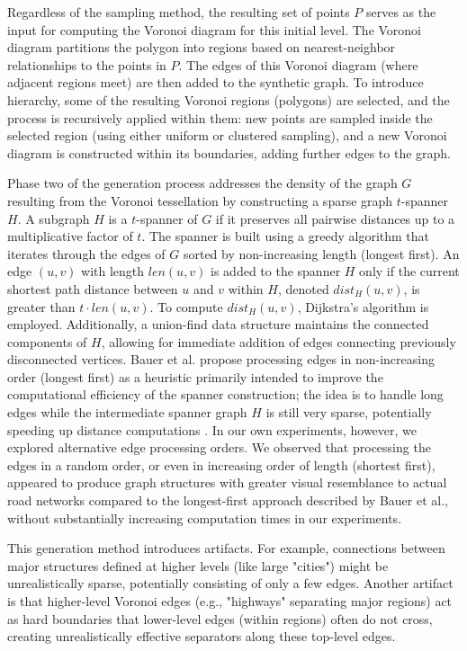 Regardless of the sampling method, the resulting set of points \(P\) serves as the input for computing the Voronoi diagram for this initial level.
The Voronoi diagram partitions the polygon into regions based on nearest-neighbor relationships to the points in \(P\).
The edges of this Voronoi diagram (where adjacent regions meet) are then added to the synthetic graph.
To introduce hierarchy, some of the resulting Voronoi regions (polygons) are selected, and the process is recursively applied within them: new points are sampled inside the selected region (using either uniform or clustered sampling), and a new Voronoi diagram is constructed within its boundaries, adding further edges to the graph.

Phase two of the generation process addresses the density of the graph \(G\) resulting from the Voronoi tessellation by constructing a sparse graph \(t\)-spanner \(H\).
A subgraph \(H\) is a \(t\)-spanner of \(G\) if it preserves all pairwise distances up to a multiplicative factor of \(t\).
The spanner is built using a greedy algorithm that iterates through the edges of \(G\) sorted by non-increasing length (longest first).
An edge \((u, v)\) with length \(len(u, v)\) is added to the spanner \(H\) only if the current shortest path distance between \(u\) and \(v\) within \(H\), denoted \(dist_H(u, v)\), is greater than \(t \cdot len(u, v)\).
To compute \(dist_H(u, v)\), Dijkstra's algorithm is employed.
Additionally, a union-find data structure maintains the connected components of \(H\), allowing for immediate addition of edges connecting previously disconnected vertices.
Bauer et al. propose processing edges in non-increasing order (longest first) as a heuristic primarily intended to improve the computational efficiency of the spanner construction; the idea is to handle long edges while the intermediate spanner graph \(H\) is still very sparse, potentially speeding up distance computations \cite{hutchison_synthetic_2010}.
In our own experiments, however, we explored alternative edge processing orders.
We observed that processing the edges in a random order, or even in increasing order of length (shortest first), appeared to produce graph structures with greater visual resemblance to actual road networks compared to the longest-first approach described by Bauer et al., without substantially increasing computation times in our experiments.

This generation method introduces artifacts.
For example, connections between major structures defined at higher levels (like large "cities") might be unrealistically sparse, potentially consisting of only a few edges.
Another artifact is that higher-level Voronoi edges (e.g., "highways" separating major regions) act as hard boundaries that lower-level edges (within regions) often do not cross, creating unrealistically effective separators along these top-level edges.

